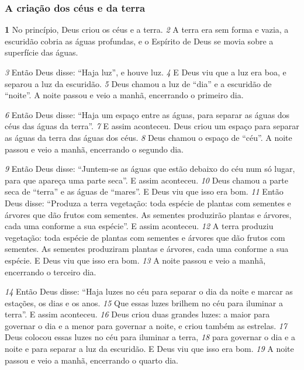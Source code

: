 \subsubsection*{A criação dos céus e da terra}
\textbf{\large 1} 
No princípio, Deus criou os céus e a terra. 
\textit{\tiny 2} 
A   terra era sem forma e vazia, a
escuridão cobria as águas profundas, e o Espírito de Deus se movia sobre a superfície das águas. 

\bigskip
\textit{\tiny 3} 
Então Deus disse: “Haja luz”, e houve luz. 
\textit{\tiny 4} 
E Deus viu que a luz era boa, e separou a luz da escuridão. 
\textit{\tiny 5} Deus chamou a luz de “dia” e a escuridão de “noite”. A noite passou e veio a manhã, encerrando o primeiro dia.

\bigskip
\textit{\tiny 6} Então Deus disse: “Haja um espaço entre as águas, para separar as águas dos céus das águas da terra”. 
\textit{\tiny 7} 
E assim aconteceu. Deus criou um espaço para separar as águas da terra das águas dos céus. 
\textit{\tiny 8} 
Deus chamou o espaço de “céu”. A noite passou e veio a manhã, encerrando o segundo dia.

\bigskip
\textit{\tiny 9} 
Então     Deus disse: “Juntem-se as águas que estão debaixo do céu num só lugar, para que apareça uma parte seca”. E assim aconteceu. 
\textit{\tiny 10} 
Deus chamou a parte seca de “terra” e as águas de “mares”. E Deus viu que isso era bom. 
\textit{\tiny 11} 
Então Deus disse: “Produza a terra vegetação: toda espécie de plantas com sementes e árvores que dão frutos com sementes. As sementes produzirão plantas e árvores, cada uma conforme a sua espécie”. E assim aconteceu.
\textit{\tiny 12} 
A terra produziu vegetação: toda espécie de plantas com sementes e árvores que dão frutos com sementes. As sementes produziram plantas e árvores, cada uma conforme a sua espécie. E Deus viu que isso era bom.      
\textit{\tiny 13}
A noite passou e veio a manhã, encerrando o terceiro dia.

\bigskip
\textit{\tiny 14}
Então  Deus disse: “Haja luzes no céu para separar o dia da noite e marcar as estações, os dias e os anos. 
\textit{\tiny 15}
Que essas luzes brilhem no céu para iluminar a terra”. E assim aconteceu. 
\textit{\tiny 16}
Deus criou duas grandes luzes: a maior para governar o dia e a menor para governar a noite, e criou também as estrelas.
\textit{\tiny 17}
Deus colocou essas luzes no céu para iluminar a terra,
\textit{\tiny 18} 
para governar o dia e a noite e para separar a luz da escuridão. E Deus viu que isso era bom.
\textit{\tiny 19}
A noite passou e veio a manhã, encerrando o quarto dia.

